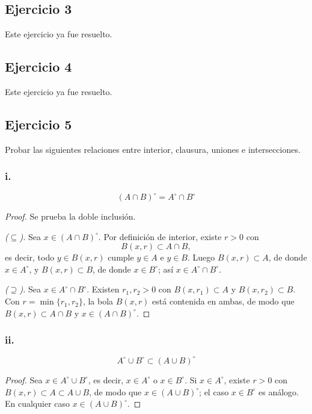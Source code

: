 \documentclass[11pt, a4paper]{article}
\begin{document}
\subsection*{Ejercicio 3}

Este ejercicio ya fue resuelto.

\subsection*{Ejercicio 4}

Este ejercicio ya fue resuelto.

\subsection*{Ejercicio 5}

Probar las siguientes relaciones entre interior, clausura, uniones e intersecciones.

\subsubsection*{i.}
$$ (A \cap B)^\circ = A^\circ \cap B^\circ $$

\begin{proof}
Se prueba la doble inclusión.

\textit{($\subseteq$).} Sea $x \in (A \cap B)^\circ$. Por definición de interior, existe $r > 0$ con
$$ B(x, r) \subset A \cap B, $$
es decir, todo $y \in B(x, r)$ cumple $y \in A$ e $y \in B$. Luego $B(x, r) \subset A$, de donde
$x \in A^\circ$, y $B(x, r) \subset B$, de donde $x \in B^\circ$; así $x \in A^\circ \cap B^\circ$.

\textit{($\supseteq$).} Sea $x \in A^\circ \cap B^\circ$. Existen $r_1, r_2 > 0$ con
$B(x, r_1) \subset A$ y $B(x, r_2) \subset B$. Con $r = \min\{r_1, r_2\}$, la bola $B(x, r)$ está
contenida en ambas, de modo que $B(x, r) \subset A \cap B$ y $x \in (A \cap B)^\circ$.
\end{proof}

\subsubsection*{ii.}
$$ A^\circ \cup B^\circ \subset (A \cup B)^\circ $$

\begin{proof}
Sea $x \in A^\circ \cup B^\circ$, es decir, $x \in A^\circ$ o $x \in B^\circ$. Si $x \in A^\circ$,
existe $r > 0$ con $B(x, r) \subset A \subset A \cup B$, de modo que $x \in (A \cup B)^\circ$; el caso
$x \in B^\circ$ es análogo. En cualquier caso $x \in (A \cup B)^\circ$.
\end{proof}
\end{document}
